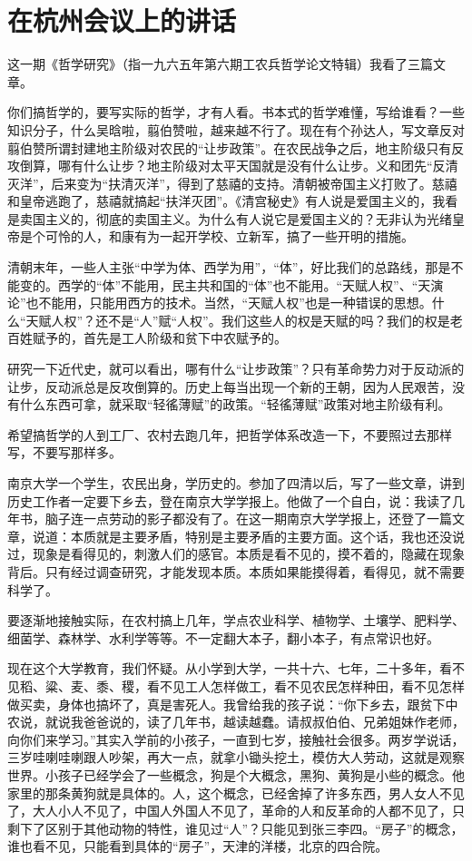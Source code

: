 \section[在杭州会议上的讲话（一九六五年十二月二十一日）]{在杭州会议上的讲话}


这一期《哲学研究》（指一九六五年第六期工农兵哲学论文特辑）我看了三篇文章。

你们搞哲学的，要写实际的哲学，才有人看。书本式的哲学难懂，写给谁看？一些知识分子，什么吴晗啦，翦伯赞啦，越来越不行了。现在有个孙达人，写文章反对翦伯赞所谓封建地主阶级对农民的“让步政策”。在农民战争之后，地主阶级只有反攻倒算，哪有什么让步？地主阶级对太平天国就是没有什么让步。义和团先“反清灭洋”，后来变为“扶清灭洋”，得到了慈禧的支持。清朝被帝国主义打败了。慈禧和皇帝逃跑了，慈禧就搞起“扶洋灭团”。《清宫秘史》有人说是爱国主义的，我看是卖国主义的，彻底的卖国主义。为什么有人说它是爱国主义的？无非认为光绪皇帝是个可怜的人，和康有为一起开学校、立新军，搞了一些开明的措施。

清朝末年，一些人主张“中学为体、西学为用”，“体”，好比我们的总路线，那是不能变的。西学的“体”不能用，民主共和国的“体”也不能用。“天赋人权”、“天演论”也不能用，只能用西方的技术。当然，“天赋人权”也是一种错误的思想。什么“天赋人权”？还不是“人”赋“人权”。我们这些人的权是天赋的吗？我们的权是老百姓赋予的，首先是工人阶级和贫下中农赋予的。

研究一下近代史，就可以看出，哪有什么“让步政策”？只有革命势力对于反动派的让步，反动派总是反攻倒算的。历史上每当出现一个新的王朝，因为人民艰苦，没有什么东西可拿，就采取“轻徭薄赋”的政策。“轻徭薄赋”政策对地主阶级有利。

希望搞哲学的人到工厂、农村去跑几年，把哲学体系改造一下，不要照过去那样写，不要写那样多。

南京大学一个学生，农民出身，学历史的。参加了四清以后，写了一些文章，讲到历史工作者一定要下乡去，登在南京大学学报上。他做了一个自白，说：我读了几年书，脑子连一点劳动的影子都没有了。在这一期南京大学学报上，还登了一篇文章，说道：本质就是主要矛盾，特别是主要矛盾的主要方面。这个话，我也还没说过，现象是看得见的，刺激人们的感官。本质是看不见的，摸不着的，隐藏在现象背后。只有经过调查研究，才能发现本质。本质如果能摸得着，看得见，就不需要科学了。

要逐渐地接触实际，在农村搞上几年，学点农业科学、植物学、土壤学、肥料学、细菌学、森林学、水利学等等。不一定翻大本子，翻小本子，有点常识也好。

现在这个大学教育，我们怀疑。从小学到大学，一共十六、七年，二十多年，看不见稻、粱、麦、黍、稷，看不见工人怎样做工，看不见农民怎样种田，看不见怎样做买卖，身体也搞坏了，真是害死人。我曾给我的孩子说：“你下乡去，跟贫下中农说，就说我爸爸说的，读了几年书，越读越蠢。请叔叔伯伯、兄弟姐妹作老师，向你们来学习。”其实入学前的小孩子，一直到七岁，接触社会很多。两岁学说话，三岁哇喇哇喇跟人吵架，再大一点，就拿小锄头挖土，模仿大人劳动，这就是观察世界。小孩子已经学会了一些概念，狗是个大概念，黑狗、黄狗是小些的概念。他家里的那条黄狗就是具体的。人，这个概念，已经舍掉了许多东西，男人女人不见了，大人小人不见了，中国人外国人不见了，革命的人和反革命的人都不见了，只剩下了区别于其他动物的特性，谁见过“人”？只能见到张三李四。“房子”的概念，谁也看不见，只能看到具体的“房子”，天津的洋楼，北京的四合院。

